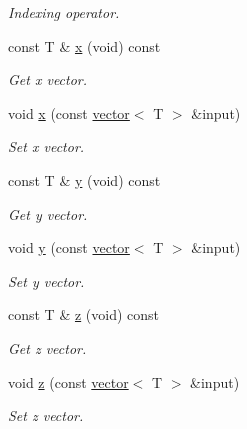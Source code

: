 \begin{DoxyCompactItemize}
\begin{DoxyCompactList}\small\item\em Indexing operator. \end{DoxyCompactList}\item 
\mbox{\label{classddd_1_1mat_object_ae5d6d780c693c989836db506094a04b1}} 
const T \& \hyperlink{classddd_1_1mat_object_ae5d6d780c693c989836db506094a04b1}{x} (void) const
\begin{DoxyCompactList}\small\item\em Get x vector. \end{DoxyCompactList}\item 
void \hyperlink{classddd_1_1mat_object_a9b1d7066a88e2f1b6cfb101fb783fdf6}{x} (const \hyperlink{classddd_1_1vector}{vector}$<$ T $>$ \&input)
\begin{DoxyCompactList}\small\item\em Set x vector. \end{DoxyCompactList}\item 
\mbox{\label{classddd_1_1mat_object_a7122d95c42d387eed62a3d821061a97f}} 
const T \& \hyperlink{classddd_1_1mat_object_a7122d95c42d387eed62a3d821061a97f}{y} (void) const
\begin{DoxyCompactList}\small\item\em Get y vector. \end{DoxyCompactList}\item 
void \hyperlink{classddd_1_1mat_object_a638f5c083ccd96c6742f062d35810193}{y} (const \hyperlink{classddd_1_1vector}{vector}$<$ T $>$ \&input)
\begin{DoxyCompactList}\small\item\em Set y vector. \end{DoxyCompactList}\item 
\mbox{\label{classddd_1_1mat_object_a627bb80e18863ae1b6dd9ba19750328b}} 
const T \& \hyperlink{classddd_1_1mat_object_a627bb80e18863ae1b6dd9ba19750328b}{z} (void) const
\begin{DoxyCompactList}\small\item\em Get z vector. \end{DoxyCompactList}\item 
void \hyperlink{classddd_1_1mat_object_ae234d843cfd0a90b5e67b946ec18bfea}{z} (const \hyperlink{classddd_1_1vector}{vector}$<$ T $>$ \&input)
\begin{DoxyCompactList}\small\item\em Set z vector. \end{DoxyCompactList}\item 

\end{DoxyCompactItemize}
